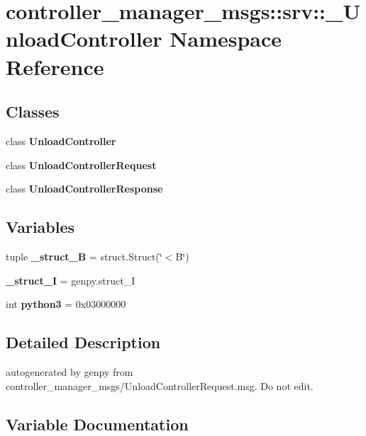 \section{controller\-\_\-manager\-\_\-msgs\-:\-:srv\-:\-:\-\_\-\-Unload\-Controller \-Namespace \-Reference}
\label{namespacecontroller__manager__msgs_1_1srv_1_1__UnloadController}
\subsection*{\-Classes}
\begin{DoxyCompactItemize}
\item 
class {\bf \-Unload\-Controller}
\item 
class {\bf \-Unload\-Controller\-Request}
\item 
class {\bf \-Unload\-Controller\-Response}
\end{DoxyCompactItemize}
\subsection*{\-Variables}
\begin{DoxyCompactItemize}
\item 
tuple {\bf \-\_\-struct\-\_\-\-B} = struct.\-Struct(\char`\"{}$<$\-B\char`\"{})
\item 
{\bf \-\_\-struct\-\_\-\-I} = genpy.\-struct\-\_\-\-I
\item 
int {\bf python3} = 0x03000000
\end{DoxyCompactItemize}


\subsection{\-Detailed \-Description}
\begin{DoxyVerb}autogenerated by genpy from controller_manager_msgs/UnloadControllerRequest.msg. Do not edit.\end{DoxyVerb}
 

\subsection{\-Variable \-Documentation}
